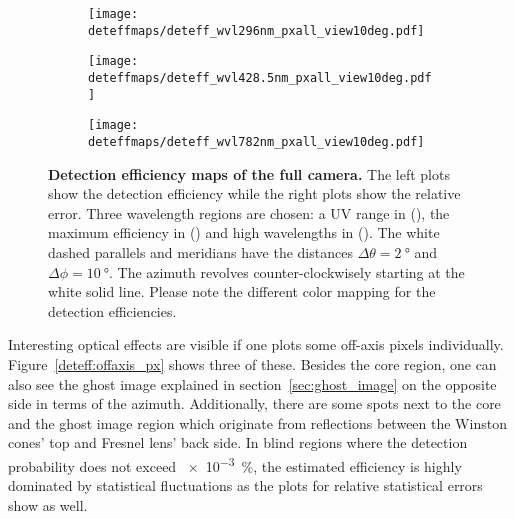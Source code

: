 \begin{figure}[H]
	\centering
	\begin{subfigure}[t]{\textwidth}
		\texttt{[image: deteffmaps/deteff\_wvl296nm\_pxall\_view10deg.pdf]}
		\label{deteff:full_cam:1}
	\end{subfigure}
\end{figure}
\begin{figure}[H]	
	\ContinuedFloat
	\centering
	\begin{subfigure}[t]{\textwidth}
		\texttt{[image: deteffmaps/deteff\_wvl428.5nm\_pxall\_view10deg.pdf]}
		\label{deteff:full_cam:2}
	\end{subfigure}
	\hfill
	\begin{subfigure}[t]{\textwidth}
		\texttt{[image: deteffmaps/deteff\_wvl782nm\_pxall\_view10deg.pdf]}
		\label{deteff:full_cam:3}
	\end{subfigure}
	\caption[Detection efficiency maps of the full camera]{\textbf{Detection efficiency maps of the full camera.} The left plots show the detection efficiency while the right plots show the relative error. Three wavelength regions are chosen: a UV range in (), the maximum efficiency in () and high wavelengths in (). The white dashed parallels and meridians have the distances $\Delta\theta=\SI{2}{\degree}$ and $\Delta\phi=\SI{10}{\degree}$. The azimuth revolves counter-clockwisely starting at the white solid line. Please note the different color mapping for the detection efficiencies.}
	\label{deteff:full_cam}		
\end{figure}

Interesting optical effects are visible if one plots some off-axis pixels individually. Figure~\ref{deteff:offaxis_px} shows three of these. Besides the core region, one can also see the ghost image explained in section~\ref{sec:ghost_image} on the opposite side in terms of the azimuth. Additionally, there are some spots next to the core and the ghost image region which originate from reflections between the Winston cones' top and Fresnel lens' back side. In blind regions where the detection probability does not exceed \SI{e-3}{\percent}, the estimated efficiency is highly dominated by statistical fluctuations as the plots for relative statistical errors show as well.\\


